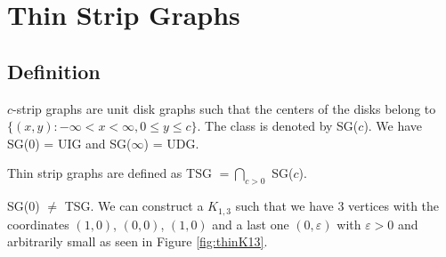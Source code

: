 \chapter{Thin Strip Graphs}


\section{Definition}

$c$-strip graphs are unit disk graphs such that the centers of the disks belong to
$\{(x,y) : -\infty < x < \infty, 0 \leq y \leq c\}$. The class is denoted by SG($c$). We
have SG(0) = UIG and SG($\infty$) = UDG. \cite{hayashiThinStripGraphs2017}

\begin{defn}
  Thin strip graphs are defined as TSG $= \bigcap_{c > 0}$ SG($c$).
\end{defn}

\begin{remark}
  SG($0$) $\neq$ TSG. We can construct a $K_{1,3}$ such that we have 3 vertices with the coordinates
  $(1,0)$, $(0,0)$, $(1,0)$ and a last one $(0,\varepsilon)$ with $\varepsilon > 0$ and arbitrarily small
  as seen in Figure \ref{fig:thinK13}.
\end{remark}

